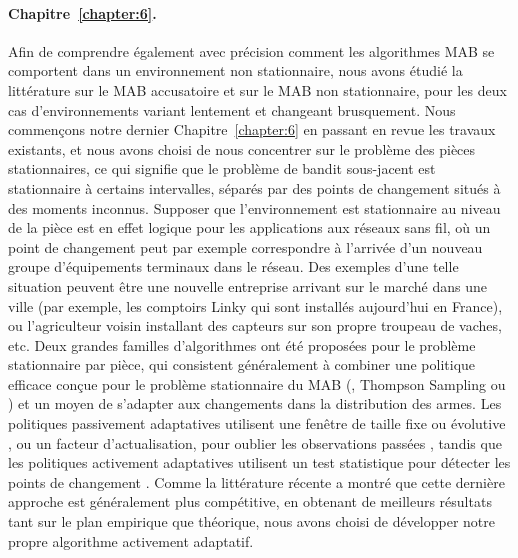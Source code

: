 \begin{resume_fr}
\paragraph{Chapitre~\ref{chapter:6}.}
%
Afin de comprendre également avec précision comment les algorithmes MAB se comportent dans un environnement non stationnaire, nous avons étudié la littérature sur le MAB accusatoire et sur le MAB non stationnaire, pour les deux cas d'environnements variant lentement et changeant brusquement.
Nous commençons notre dernier Chapitre~\ref{chapter:6} en passant en revue les travaux existants,
et nous avons choisi de nous concentrer sur le problème des pièces stationnaires,
ce qui signifie que le problème de bandit sous-jacent est stationnaire à certains intervalles, séparés par des points de changement situés à des moments inconnus.
Supposer que l'environnement est stationnaire au niveau de la pièce est en effet logique pour les applications aux réseaux sans fil, où un point de changement peut par exemple correspondre à l'arrivée d'un nouveau groupe d'équipements terminaux dans le réseau. Des exemples d'une telle situation peuvent être une nouvelle entreprise arrivant sur le marché dans une ville (par exemple, les comptoirs Linky qui sont installés aujourd'hui en France), ou l'agriculteur voisin installant des capteurs sur son propre troupeau de vaches, etc.
%
Deux grandes familles d'algorithmes ont été proposées pour le problème stationnaire par pièce,
qui consistent généralement à combiner une politique efficace conçue pour le problème stationnaire du MAB (\eg, Thompson Sampling ou \klUCB) et un moyen de s'adapter aux changements dans la distribution des armes.
Les politiques passivement adaptatives utilisent une fenêtre de taille fixe ou évolutive \cite{Garivier11UCBDiscount}, ou un facteur d'actualisation, pour oublier les observations passées \cite{Kocsis06,Gupta11thompson},
tandis que les politiques activement adaptatives utilisent un test statistique pour détecter les points de changement \cite{MellorShapiro13,Allesiardo15}.
%
Comme la littérature récente a montré que cette dernière approche est généralement plus compétitive, en obtenant de meilleurs résultats tant sur le plan empirique que théorique, nous avons choisi de développer notre propre algorithme activement adaptatif.


\end{resume_fr}
